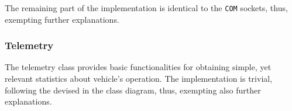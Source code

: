 The remaining part of the implementation is identical to the \texttt{COM}
sockets, thus, exempting further explanations.
%
\subsubsection{Telemetry}%
\label{sec:telem-rvvs-implem}
The telemetry class provides basic functionalities for obtaining simple, yet
relevant statistics about vehicle's operation. The implementation is trivial,
following the devised in the class diagram, thus, exempting also further explanations.
%
%
%  
%
%
